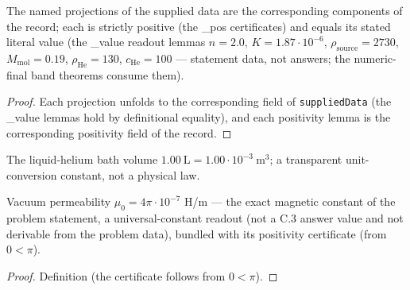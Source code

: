 \begin{lemma}
\label{lem:IPhO2026Problems_problem_IPhO_2026_3_C_3:pmtAmount}
The named projections of the supplied data are the corresponding components
of the record; each is strictly positive (the \_pos certificates) and equals
its stated literal value (the \_value readout lemmas $n = 2.0$,
$K = 1.87{\cdot}10^{-6}$, $\rho_{\mathrm{source}} = 2730$,
$M_{\mathrm{mol}} = 0.19$, $\rho_{\mathrm{He}} = 130$,
$c_{\mathrm{He}} = 100$ — statement data, not answers; the numeric-final
band theorems consume them).
\end{lemma}
\begin{proof}
Each projection unfolds to the corresponding field of \texttt{suppliedData}
(the \_value lemmas hold by definitional equality), and each positivity
lemma is the corresponding positivity field of the record.
\end{proof}

\begin{definition}
\label{def:IPhO2026Problems_problem_IPhO_2026_3_C_3:heliumBathVolume}
The liquid-helium bath volume $1.00\ \mathrm{L} = 1.00{\cdot}10^{-3}\ \mathrm{m}^3$;
a transparent unit-conversion constant, not a physical law.
\end{definition}

\begin{definition}
\label{def:IPhO2026Problems_problem_IPhO_2026_3_C_3:vacuumPermeability}
Vacuum permeability $\mu_0 = 4\pi{\cdot}10^{-7}$ H/m — the exact magnetic
constant of the problem statement, a universal-constant readout (not a C.3
answer value and not derivable from the problem data), bundled with its
positivity certificate (from $0 < \pi$).
\end{definition}
\begin{proof}
Definition (the certificate follows from $0 < \pi$).
\end{proof}

